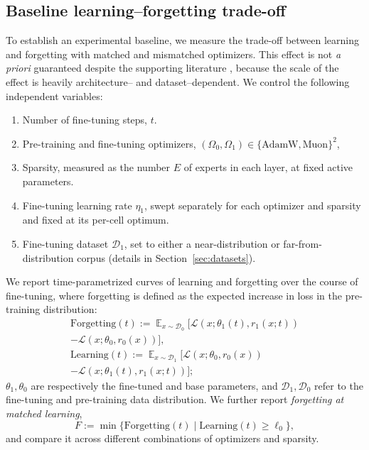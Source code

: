 \documentclass[11pt,a4paper]{article}
\DeclareMathOperator*{\E}{\mathbb{E}}
\newcommand{\D}{\mathcal{D}}
\newcommand{\Loss}{\mathcal{L}}
\begin{document}
\subsection{Baseline learning--forgetting trade-off}
\label{sec:3.1}
To establish an experimental baseline, we measure the trade-off between learning and forgetting with matched and mismatched optimizers. This effect is not \textit{a priori} guaranteed despite the supporting literature \cite{liu2026consistency,qu2026canmuon,zhao2026ephemeral}, because the scale of the effect is heavily architecture-- and dataset--dependent. We control the following independent variables: 
\begin{enumerate}[label=\alph*)]
    \item Number of fine-tuning steps, $t$.
    \item Pre-training and fine-tuning optimizers, $(\Omega_0, \Omega_1) \in \{\text{AdamW}, \text{Muon}\}^2$,
    \item Sparsity, measured as the number $E$ of experts in each layer, at fixed active parameters.
    \item Fine-tuning learning rate $\eta_1$, swept separately for each optimizer and sparsity and fixed at its per-cell optimum.
    \item Fine-tuning dataset $\D_1$, set to either a near-distribution or far-from-distribution corpus (details in Section~\ref{sec:datasets}).

\end{enumerate}
We report time-parametrized curves of learning and forgetting over the course of fine-tuning, where forgetting is defined as the expected increase in loss in the pre-training distribution:
\begin{equation}\label{eq:forgetting}
    \begin{aligned} 
    \text{Forgetting}(t) := \E_{x \sim \D_0}[\Loss(x; \theta_1(t), r_1(x; t))  \\ - \Loss(x; \theta_0, r_0(x))], \\
    \text{Learning}(t) := \E_{x \sim \D_1}[\Loss(x; \theta_0, r_0(x)) \\ - \Loss(x; \theta_1(t), r_1(x; t))];
\end{aligned}
\end{equation}
$\theta_1, \theta_0$ are respectively the fine-tuned and base parameters, and $\D_1, \D_0$ refer to the fine-tuning and pre-training data distribution. We further report \textit{forgetting at matched learning},
\begin{equation} \label{eq:fixed-learning}
    F :=\min \{\text{Forgetting}(t) \mid \text{Learning}(t) \geq \ell_0\},
\end{equation}
and compare it across different combinations of optimizers and sparsity.
\end{document}
